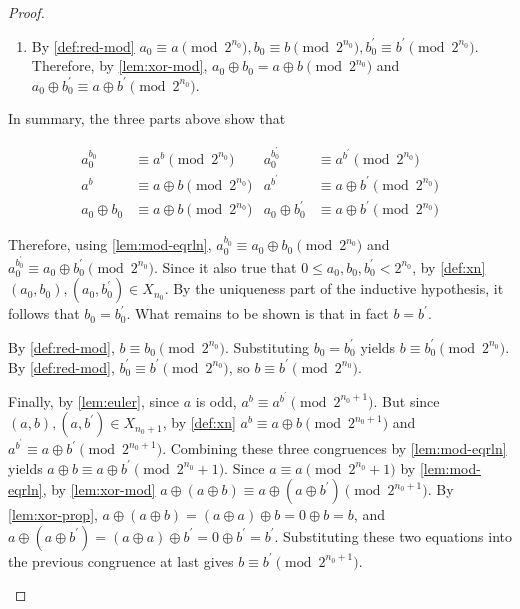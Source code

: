 \documentclass[1gpt]{article}
\theoremstyle{break}
\newcommand{\xor}{\oplus}
\begin{document}
\begin{proof}
\begin{enumerate}
\begin{enumerate}
                \item

                    By \ref{def:red-mod} $a_0 \equiv a \pmod{2^{n_0}}, b_0
                    \equiv b \pmod{2^{n_0}}, b^\prime_0 \equiv b^\prime
                    \pmod{2^{n_0}}$. Therefore, by \ref{lem:xor-mod}, $a_0 \xor
                    b_0 = a \xor b \pmod{2^{n_0}}$ and $a_0 \xor b^\prime_0
                    \equiv a \xor b^\prime \pmod{2^{n_0}}$.
                    
            \end{enumerate}

            In summary, the three parts above show that

            \begin{align*}
                a_0^{b_0} &\equiv a^b \pmod{2^{n_0}} & a_0^{b^\prime_0} &\equiv a^{b^\prime} \pmod{2^{n_0}} \\
                a^b &\equiv a \xor b \pmod{2^{n_0}} & a^{b^\prime} &\equiv a \xor b^\prime \pmod{2^{n_0}} \\
                a_0 \xor b_0 &\equiv a \xor b \pmod{2^{n_0}} & a_0 \xor b^\prime_0 &\equiv a \xor b^\prime \pmod{2^{n_0}}
            \end{align*}

            Therefore, using \ref{lem:mod-eqrln}, $a_0^{b_0} \equiv a_0 \xor
            b_0 \pmod{2^{n_0}}$ and $a_0^{b^\prime_0} \equiv a_0 \xor
            b^\prime_0 \pmod{2^{n_0}}$. Since it also true that $0 \leq a_0,
            b_0, b^\prime_0 < 2^{n_0}$, by \ref{def:xn} $(a_0, b_0), (a_0,
            b^\prime_0) \in X_{n_0}$. By the uniqueness part of the inductive
            hypothesis, it follows that $b_0 = b^\prime_0$. What remains to be
            shown is that in fact $b = b^\prime$.

            By \ref{def:red-mod}, $b \equiv b_0 \pmod{2^{n_0}}$. Substituting
            $b_0 = b^\prime_0$ yields $b \equiv b^\prime_0 \pmod{2^{n_0}}$. By
            \ref{def:red-mod}, $b^\prime_0 \equiv b^\prime \pmod{2^{n_0}}$, so
            $b \equiv b^\prime \pmod{2^{n_0}}$.

            Finally, by \ref{lem:euler}, since $a$ is odd, $a^b \equiv
            a^{b^\prime} \pmod{2^{n_0+1}}$. But since $(a, b), (a, b^\prime)
            \in X_{n_0+1}$, by \ref{def:xn} $a^b \equiv a \xor b
            \pmod{2^{n_0+1}}$ and $a^{b^\prime} \equiv a \xor b^\prime
            \pmod{2^{n_0+1}}$. Combining these three congruences by
            \ref{lem:mod-eqrln} yields $a \xor b \equiv a \xor b^\prime
            \pmod{2^{n_0}+1}$. Since $a \equiv a \pmod{2^{n_0} + 1}$ by
            \ref{lem:mod-eqrln}, by \ref{lem:xor-mod} $a \xor (a \xor b) \equiv
            a \xor (a \xor b^\prime) \pmod{2^{n_0+1}}$. By \ref{lem:xor-prop},
            $a \xor (a \xor b) = (a \xor a) \xor b = 0 \xor b = b$, and $a \xor
            (a \xor b^\prime) = (a \xor a) \xor b^\prime = 0 \xor b^\prime =
            b^\prime$. Substituting these two equations into the previous
            congruence at last gives $b \equiv b^\prime \pmod{2^{n_0+1}}$.


\end{enumerate}
\end{proof}
\end{document}
